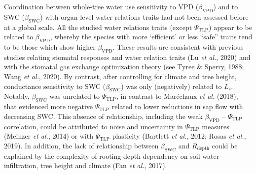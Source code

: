 \documentclass[11pt,twoside]{reedthesis}
\begin{document}
Coordination between whole-tree water use sensitivity to VPD
(\(\beta_{\text{VPD}}\)) and to SWC (\(\beta_{\text{SWC}}\)) with
organ-level water relations traits had not been assessed before at a
global scale. All the studied water relations traits (except
\(\Psi_{\text{TLP}}\)) appear to be related to \(\beta_{\text{VPD}}\),
whereby the species with more `efficient' or less ``safe'' traits tend
to be those which show higher \(\beta_{\text{VPD}}\). These results are
consistent with previous studies relating stomatal responses and water
relation traits (Lu \emph{et al.}, 2020) and with the stomatal gas
exchange optimization theory (see Tyree \& Sperry, 1988; Wang \emph{et
al.}, 2020). By contrast, after controlling for climate and tree height,
conductance sensitivity to SWC (\(\beta_{\text{SWC}}\)) was only
(negatively) related to \(L_\text{s}\). Notably, \(\beta_{\text{SWC}}\)
was unrelated to \(\Psi_{\text{TLP}}\), in contrast to Maréchaux
\emph{et al.} (2018), that evidenced more negative \(\Psi_{\text{TLP}}\)
related to lower reductions in sap flow with decreasing SWC. This
absence of relationship, including the weak \(\beta_{\text{VPD}}\) --
\(\Psi_{\text{TLP}}\) correlation, could be attributed to noise and
uncertainty in \(\Psi_{\text{TLP}}\) measures (Meinzer \emph{et al.},
2014) or with \(\Psi_{\text{TLP}}\) plasticity (Bartlett \emph{et al.},
2012; Rosas \emph{et al.}, 2019). In addition, the lack of relationship
between \(\beta_{\text{SWC}}\) and \(R_{\text{depth}}\) could be
explained by the complexity of rooting depth dependency on soil water
infiltration, tree height and climate (Fan \emph{et al.}, 2017).\par
\end{document}
